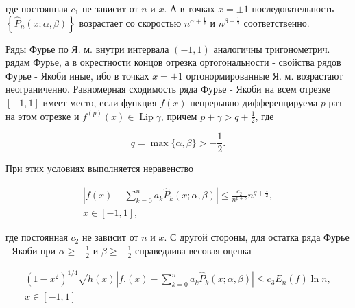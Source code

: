 \documentclass[10pt]{article}
\begin{document}
где постоянная $c_{1}$ не зависит от $n$ и $x$. А в точках $x= \pm 1$ последовательность $\left\{\hat{P}_{n}(x ; \alpha, \beta)\right\}$ возрастает со скоростью $n^{\alpha+\frac{1}{2}}$ и $n^{\beta+\frac{1}{2}}$ соответственно.



Ряды Фурье по Я. м. внутри интервала $(-1,1)$ аналогичны тригонометрич. рядам Фурье, а в окрестности концов отрезка ортогональности - свойства рядов Фурье - Якоби иные, ибо в точках $x= \pm 1$ ортонормированные Я. м. возрастают неограниченно. Равномерная сходимость ряда Фурье - Якоби на всем отрезке $[-1,1]$ имеет место, если функция $f(x)$ непрерывно дифференцируема $p$ раз на этом отрезке и $f^{(p)}(x) \in \operatorname{Lip} \gamma$, причем $p+\gamma>q+\frac{1}{2}$, где



\[

q=\max \{\alpha, \beta\}>-\frac{1}{2} .

\]



При этих условиях выполняется неравенство



\[

\begin{gathered}

\left|f(x)-\sum_{k=0}^{n} a_{k} \hat{P}_{k}(x ; \alpha, \beta)\right| \leqslant \frac{c_{2}}{n^{p+\gamma}} n^{q+\frac{1}{2}}, \\

x \in[-1,1],

\end{gathered}

\]



где постоянная $c_{2}$ не зависит от $n$ и $x$. С другой стороны, для остатка ряда Фурье - Якоби при $\alpha \geqslant-\frac{1}{2}$ и $\beta \geqslant-\frac{1}{2}$ справедлива весовая оценка



\[

\begin{gathered}

\left(1-x^{2}\right)^{1 / 4} \sqrt{h(x)}\left|f .(x)-\sum_{k=0}^{n} a_{k} \hat{P}_{k}(x ; \alpha, \beta)\right| \leqslant c_{3} E_{n}(f) \ln n, \\

x \in[-1,1]

\end{gathered}

\]
\end{document}
